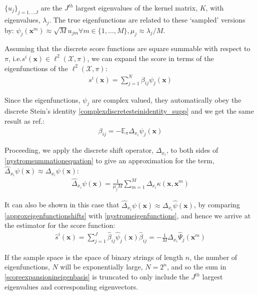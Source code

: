 \noindent $\{u_j\}_{j = 1, \dots J}$ are the $J^{th}$ largest eigenvalues of the kernel matrix, $K$, with eigenvalues, $\lambda_j$. The true eigenfunctions are related to these `sampled' versions by: $\psi_j(\mathbf{x}^m) \approx \sqrt{M} u_{jm} \forall m \in\{1, \dots, M\}, \mu_j \approx \lambda_j/M$.

Assuming that the discrete score functions are square summable with respect to $\pi$, i.e.\@ $s^i(\mathbf{x}) \in \ell^2(\mathcal{X}, \pi)$, we can expand the score in terms of the eigenfunctions of the $\ell^2(\mathcal{X}, \pi)$:
\begin{align}
    s^i(\mathbf{x}) = \sum\limits^{N}_{j=1}\beta_{ij}\psi_j(\mathbf{x}) \label{scoreexpansionineigenbasis}
\end{align}

\noindent Since the eigenfunctions, $\psi_j$ are complex valued, they automatically obey the discrete Stein's identity \eqref{complexdiscretesteinidentity_supp} and we get the same result as ref.:
\begin{align}
    \beta_{ij} = -\mathbb{E}_{\pi}\Delta_{x_i}\psi_j(\mathbf{x})
\end{align}


\noindent Proceeding, we apply the discrete shift operator, $\Delta_{x_i}$, to both sides of \eqref{nystromsummationequation} to give an approximation for the term, $\hat{\Delta}_{x_i}\psi(\mathbf{x})  \approx \Delta_{x_i}\psi(\mathbf{x})$:
\begin{align}
    \hat{\Delta}_{x_i}\psi(\mathbf{x}) = \frac{1}{\mu_j M}\sum\limits_{m=1}^M\Delta_{x_i}\kappa(\mathbf{x}, \mathbf{x}^m) \label{approxeigenfunctionshifts}
\end{align}


\noindent It can also be shown in this case that $\hat{\Delta}_{x_i}\psi(\mathbf{x}) \approx \Delta_{x_i}\hat{\psi}(\mathbf{x})$, by comparing \eqref{approxeigenfunctionshifts} with \eqref{nystromeigenfunctions}, and hence we arrive at the estimator for the score function:
\begin{align}
    \hat{s}^i(\mathbf{x}) = \sum\limits_{j=1}^J \hat{\beta}_{ij}\hat{\psi}_j(\mathbf{x}) \hat{\beta}_{ij} = -\frac{1}{M}\Delta_{x_i}\hat{\Psi}_j(\mathbf{x}^m) \label{spectralestimationfunctions}
\end{align}


\noindent If the sample space is the space of binary strings of length $n$, the number of eigenfunctions, $N$ will be exponentially large, $N = 2^n$, and so the sum in \eqref{scoreexpansionineigenbasis} is truncated to only include the $J^{th}$ largest eigenvalues and corresponding eigenvectors.